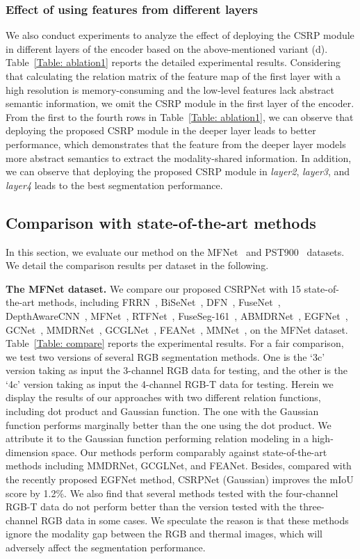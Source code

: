 \subsubsection{Effect of using features from different layers} We also conduct experiments to analyze the effect of deploying the CSRP module in different layers of the encoder based on the above-mentioned variant (d).
Table~\ref{Table: ablation1} reports the detailed experimental results. Considering that calculating the relation matrix of the feature map of the first layer with a high resolution is memory-consuming and the low-level features lack abstract semantic information, we omit the CSRP module in the first layer of the encoder. From the first to the fourth rows in Table~\ref{Table: ablation1}, we can observe that deploying the proposed CSRP module in the deeper layer leads to better performance, which demonstrates that the feature from the deeper layer models more abstract semantics to extract the modality-shared information. In addition, we can observe that deploying the proposed CSRP module in \emph{layer2}, \emph{layer3}, and \emph{layer4} leads to the best segmentation performance. 

\subsection{Comparison with state-of-the-art methods}
In this section, we evaluate our method on the MFNet~\cite{MFNet} and PST900~\cite{PSTNet} datasets. We detail the comparison results per dataset in the following.

\vspace{1mm}
\noindent\textbf{The MFNet dataset.}
We compare our proposed CSRPNet with 15 state-of-the-art methods, including FRRN~\cite{FRRN}, BiSeNet~\cite{bisenet}, DFN~\cite{DFN}, FuseNet~\cite{Fusenet}, DepthAwareCNN~\cite{DepthAwareCNN}, MFNet~\cite{MFNet}, RTFNet~\cite{RTFNet}, FuseSeg-161~\cite{FuseSeg}, ABMDRNet~\cite{ABMDRNet}, EGFNet~\cite{EGFNet}, GCNet~\cite{GCNet}, MMDRNet~\cite{MMDRNet}, GCGLNet~\cite{GCGLNet}, FEANet~\cite{FEANet}, MMNet~\cite{MMNet}, on the MFNet dataset. 
Table~\ref{Table: compare} reports the experimental results. For a fair comparison, we test two versions of several RGB segmentation methods. One is the `3c' version taking as input the 3-channel RGB data for testing, and the other is the `4c' version taking as input the 4-channel RGB-T data for testing. Herein we display the results of our approaches with two different relation functions, including dot product and Gaussian function. The one with the Gaussian function performs marginally better than the one using the dot product. We attribute it to the Gaussian function performing relation modeling in a high-dimension space.
Our methods perform comparably against state-of-the-art methods including MMDRNet, GCGLNet, and FEANet. Besides, compared with the recently proposed EGFNet method, CSRPNet (Gaussian) improves the mIoU score by 1.2\%. We also find that several methods tested with the four-channel RGB-T data do not perform better than the version tested with the three-channel RGB data in some cases. We speculate the reason is that these methods ignore the modality gap between the RGB and thermal images, which will adversely affect the segmentation performance.


